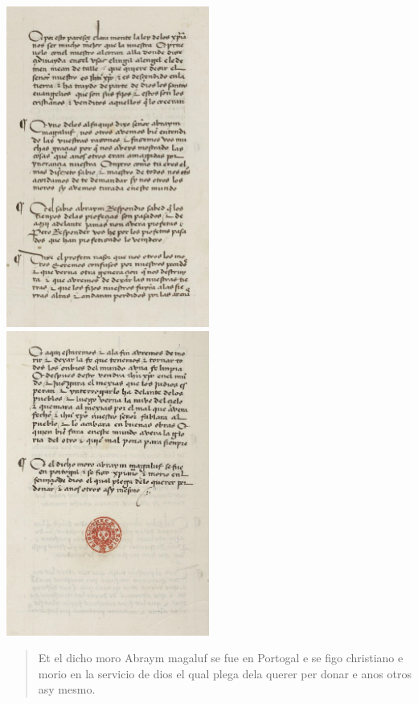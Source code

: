 \includegraphics[width=0.5\textwidth]{HistoireIslamMediterranee/Images/DisputaFez9.png}
\includegraphics[width=0.5\textwidth]{HistoireIslamMediterranee/Images/DisputaFez10.png}
 
\begin{quote}
Et el dicho moro Abraym magaluf se fue en Portogal e se figo christiano e morio en la servicio de dios el qual plega dela querer per donar e anos otros asy mesmo.
\end{quote}